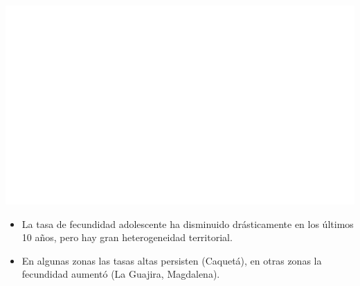 \documentclass[aspectratio=169]{beamer}
\begin{document}
    \begin{slide}{14} 
            \begin{imagecolumn}
                \includegraphics[width=\columnwidth]{img/var_282_map.png}
            \end{imagecolumn}
            \begin{textcolumn}
                \begin{itemize}
                    \item La tasa de fecundidad adolescente ha disminuido drásticamente en los últimos 10 años, pero hay gran heterogeneidad territorial.
                    \item En algunas zonas las tasas altas persisten (Caquetá), en otras zonas la fecundidad aumentó (La Guajira, Magdalena).
                \end{itemize}
            \end{textcolumn}

    \printcolumns
    \end{slide}
    
\end{document}
